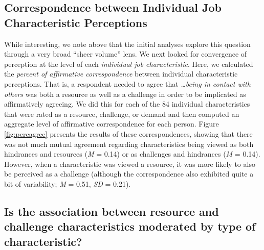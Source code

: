 \documentclass[
  man]{apa6}
\begin{document}
\hypertarget{correspondence-between-individual-job-characteristic-perceptions}{%
\subsection{Correspondence between Individual Job Characteristic Perceptions}\label{correspondence-between-individual-job-characteristic-perceptions}}

While interesting, we note above that the initial analyses explore this question through a very broad ``sheer volume'' lens. We next looked for convergence of perception at the level of each \emph{individual job characteristic}. Here, we calculated the \emph{percent of affirmative correspondence} between individual characteristic perceptions. That is, a respondent needed to agree that \emph{\ldots being in contact with others} was both a resource as well as a challenge in order to be implicated as affirmatively agreeing. We did this for each of the 84 individual characteristics that were rated as a resource, challenge, or demand and then computed an aggregate level of affirmative correspondence for each person. Figure \ref{fig:percagree} presents the results of these correspondences, showing that there was not much mutual agreement regarding characteristics being viewed as both hindrances and resources (\emph{M} = 0.14) or as challenges and hindrances (\emph{M} = 0.14). However, when a characteristic was viewed a resource, it was more likely to also be perceived as a challenge (although the correspondence also exhibited quite a bit of variability; \emph{M} = 0.51, \emph{SD} = 0.21).

\hypertarget{is-the-association-between-resource-and-challenge-characteristics-moderated-by-type-of-characteristic}{%
\subsection{Is the association between resource and challenge characteristics moderated by type of characteristic?}\label{is-the-association-between-resource-and-challenge-characteristics-moderated-by-type-of-characteristic}}
\end{document}

